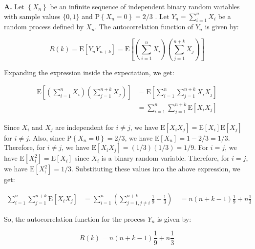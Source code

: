 \documentclass[main.tex]{subfiles}
\begin{document}
\begin{enumerate}
\begin{enumerate}
        \textbf{A.} Let $\left\{X_n\right\}$ be an infinite sequence of independent binary random variables with sample values $\{0,1\}$ and $\mathrm{P}\left\{X_n=0\right\}=2 / 3$ . Let $Y_n=\sum_{i=1}^n X_i$ be a random process defined by $X_n$. The autocorrelation function of $Y_n$ is given by:
        
        $$
        R(k)=\mathrm{E}\left[Y_n Y_{n+k}\right]=\mathrm{E}\left[\left(\sum_{i=1}^n X_i\right)\left(\sum_{j=1}^{n+k} X_j\right)\right]
        $$
        
        Expanding the expression inside the expectation, we get: 

        $$
        \begin{aligned} 
        \mathrm{E}\left[\left(\sum_{i=1}^n X_i\right)\left(\sum_{j=1}^{n+k} X_j\right)\right] 
        &= \mathrm{E}\left[\sum_{i=1}^n \sum_{j=1}^{n+k} X_iX_j\right] \\ 
        &= \sum_{i=1}^n \sum_{j=1}^{n+k} \mathrm{E}[X_iX_j] 
        \end{aligned}
        $$

        Since $X_i$ and $X_j$ are independent for $i \neq j$, we have $\mathrm{E}\left[X_i X_j\right]=\mathrm{E}\left[X_i\right] \mathrm{E}\left[X_j\right]$ for $i \neq j$. Also, since $\mathrm{P}\left\{X_n=0\right\}=2 / 3$, we have $\mathrm{E}\left[X_n\right]=1-2 / 3=1 / 3$. Therefore, for $i \neq j$, we have $\mathrm{E}\left[X_i X_j\right]=(1 / 3)(1 / 3)=1 / 9$. For $i=j$, we have $\mathrm{E}\left[X_i^2\right]=\mathrm{E}\left[X_i\right]$ since $X_i$ is a binary random variable. Therefore, for $i=j$, we have $\mathrm{E}\left[X_{\mathrm{i}}^2\right]=1 / 3$.
        Substituting these values into the above expression, we get: 

        $$
        \begin{aligned} 
        \sum_{i=1}^n \sum_{j=1}^{n+k} \mathrm{E}[X_iX_j] &= \sum_{i=1}^n \left(\sum_{j=1, j\neq i}^{n+k} \frac{1}{9} + \frac{1}{3}\right) \ &= n(n+k-1)\frac{1}{9} + n\frac{1}{3} 
        \end{aligned}
        $$
        
        So, the autocorrelation function for the process $Y_n$ is given by:
        
        $$
        R(k)=n(n+k-1) \frac{1}{9}+n \frac{1}{3}
        $$
        
    \end{enumerate}
    
\end{enumerate}
\end{document}
